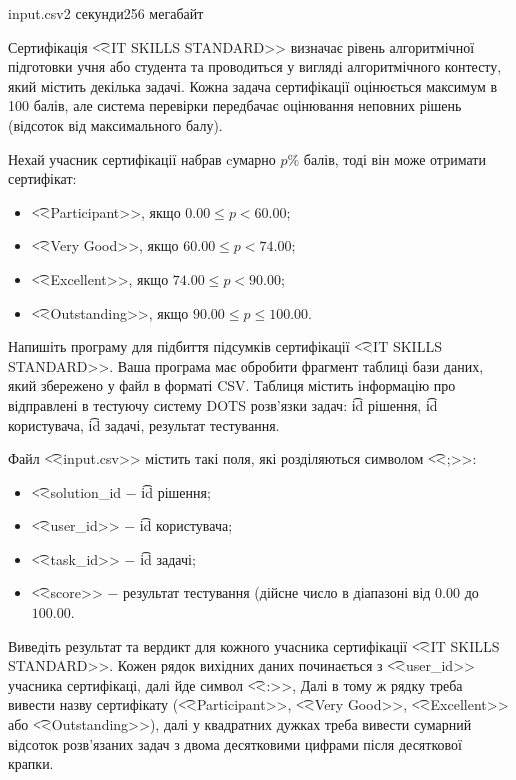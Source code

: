 \begin{problem}{}{input.csv}{}{2 секунди}{256 мегабайт}

Сертифікація \t{<<IT SKILLS STANDARD>>} визначає рівень алгоритмічної підготовки учня або студента 
та проводиться у вигляді алгоритмічного контесту, який містить декілька задачі. 
Кожна задача сертифікації оцінюється максимум в 100 балів, але система перевірки
передбачає оцінювання неповних рішень (відсоток від максимального балу).

Нехай учасник сертифікації набрав cумарно $p$\% балів, тоді він може отримати сертифікат: 
\begin{itemize}
  \item \t{<<Participant>>}, якщо $0.00 \le p < 60.00$; 
  \item \t{<<Very Good>>}, якщо $60.00 \le p < 74.00$; 
  \item \t{<<Excellent>>}, якщо $74.00 \le p < 90.00$;
  \item \t{<<Outstanding>>}, якщо $90.00 \le p \le 100.00$.
\end{itemize}

Напишіть програму для підбиття підсумків сертифікації \t{<<IT SKILLS STANDARD>>}.
Ваша програма має обробити фрагмент таблиці бази даних, який збережено у файл в форматі CSV.
Таблиця містить інформацію про відправлені в тестуючу систему DOTS розв'язки задач: 
\t{id} рішення, \t{id} користувача, \t{id} задачі, результат тестування.

\InputFile
Файл \t{<<input.csv>>} містить такі поля, які розділяються символом \t{<<;>>}:
\begin{itemize}
  \item \t{<<solution\_id} $-$ \t{id} рішення;
  \item \t{<<user\_id>>} $-$ \t{id} користувача;
  \item \t{<<task\_id>>} $-$ \t{id} задачі;
  \item \t{<<score>>} $-$ результат тестування (дійсне число в діапазоні від $0.00$ до $100.00$. 
\end{itemize}

\OutputFile
Виведіть результат та вердикт для кожного учасника сертифікації \t{<<IT SKILLS STANDARD>>}.
Кожен рядок вихідних даних починається з \t{<<user\_id>>} учасника сертифікаці, далі йде символ \t{<<:>>}, 
Далі в тому ж рядку треба вивести назву сертифікату (\t{<<Participant>>}, \t{<<Very Good>>},
\t{<<Excellent>>} або \t{<<Outstanding>>}), далі у квадратних дужках треба вивести сумарний відсоток
розв'язаних задач з двома десятковими цифрами після десяткової крапки.

\Example
\begin{example}
%
\end{example}

\end{problem}

